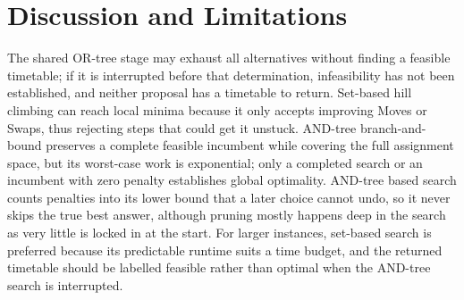 \section{Discussion and Limitations}
\label{sec:discussion}

The shared OR-tree stage may exhaust all alternatives without finding a feasible timetable; if it is interrupted before that determination, infeasibility has not been established, and neither proposal has a timetable to return. Set-based hill climbing can reach local minima because it only accepts improving Moves or Swaps, thus rejecting steps that could get it unstuck. AND-tree branch-and-bound preserves a complete feasible incumbent while covering the full assignment space, but its worst-case work is exponential; only a completed search or an incumbent with zero penalty establishes global optimality. AND-tree based search counts penalties into its lower bound that a later choice cannot undo, so it never skips the true best answer, although pruning mostly happens deep in the search as very little is locked in at the start. For larger instances, set-based search is preferred because its predictable runtime suits a time budget, and the returned timetable should be labelled feasible rather than optimal when the AND-tree search is interrupted.

